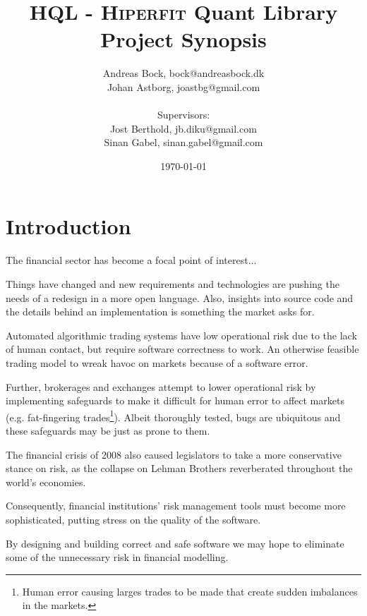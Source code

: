 \documentclass[11pt]{article}
\makeatletter
\def\Author{Andreas Bock, bock@andreasbock.dk\\
Johan Astborg, joastbg@gmail.com\\\\
Supervisors:\\
Jost Berthold, jb.diku@gmail.com\\
Sinan Gabel, sinan.gabel@gmail.com
}
\def\Title{\bf HQL - \textsc{Hiperfit} Quant Library\\ {\Large Project Synopsis}}
\makeatother
\begin{document}
\title{\Title}
\author{\Author}
\date{\today}
\maketitle

\begin{abstract}


\end{abstract}

\section*{Introduction}

The financial sector has become a focal point of interest...

Things have changed and new requirements and technologies are pushing the needs
of a redesign in a more open language. Also, insights into source code and the
details behind an implementation is something the market asks for.

Automated algorithmic trading systems have low operational risk due to the lack
of human contact, but require software correctness to work. An otherwise feasible
trading model to wreak havoc on markets because of a software error.

Further, brokerages and exchanges attempt to lower operational risk by implementing
safeguards to make it difficult for human error to affect markets (e.g. fat-fingering
trades\footnote{Human error causing larges trades to be made that create sudden imbalances in the markets.}). Albeit thoroughly tested, bugs are ubiquitous and
these safeguards may be just as prone to them. 

The financial crisis of 2008 also caused legislators to take a more conservative
stance on risk, as the collapse on Lehman Brothers reverberated throughout
the world's economies.

Consequently, financial institutions' risk management tools must become more
sophisticated, putting stress on the quality of the software.

By designing and building correct and safe software we may hope to eliminate some
of the unnecessary risk in financial modelling.
\end{document}
